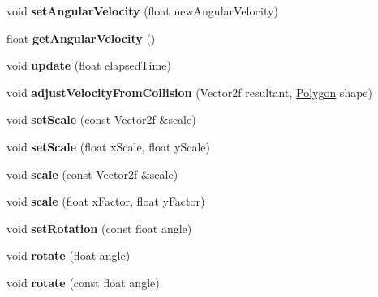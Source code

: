 \begin{DoxyCompactItemize}
\item 
\mbox{\label{class_polygon_a9444a506f5e33f11772854396e1aae0e}} 
void {\bfseries set\+Angular\+Velocity} (float new\+Angular\+Velocity)
\item 
\mbox{\label{class_polygon_a1c28d47f1c0f779cfd5ef31815046a6f}} 
float {\bfseries get\+Angular\+Velocity} ()
\item 
\mbox{\label{class_polygon_a556290c37a29ce71f8488a75509b56af}} 
void {\bfseries update} (float elapsed\+Time)
\item 
\mbox{\label{class_polygon_aeb1576854a28a02afaa636aadf31b992}} 
void {\bfseries adjust\+Velocity\+From\+Collision} (Vector2f resultant, \mbox{\hyperlink{class_polygon}{Polygon}} shape)
\item 
\mbox{\label{class_polygon_aacc719afa9e8befd7ab7ba5ea3eb4d24}} 
void {\bfseries set\+Scale} (const Vector2f \&scale)
\item 
\mbox{\label{class_polygon_a1454b2d9f4ca39f627ea6c54a26a3287}} 
void {\bfseries set\+Scale} (float x\+Scale, float y\+Scale)
\item 
\mbox{\label{class_polygon_ab908fe54a3dfad70b489578b4d0f0e42}} 
void {\bfseries scale} (const Vector2f \&scale)
\item 
\mbox{\label{class_polygon_ac2b18a3139994184f83967add25f72aa}} 
void {\bfseries scale} (float x\+Factor, float y\+Factor)
\item 
\mbox{\label{class_polygon_a3eda0b68b585dcdb570be42005f05b66}} 
void {\bfseries set\+Rotation} (const float angle)
\item 
\mbox{\label{class_polygon_aa31dcb66b6c3bffd9643590abf805c26}} 
void {\bfseries rotate} (float angle)
\item 
\mbox{\label{class_polygon_a7a5ab6dbbe25ae8c274c6a86e410288a}} 
void {\bfseries rotate} (const float angle)
\item 
\mbox{\label{class_polygon_adfc4599e0ae29def502ac68c69ba38c0}} 

\end{DoxyCompactItemize}
